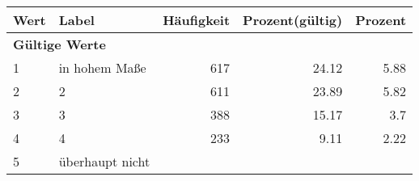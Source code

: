      \begin{longtable}{lXrrr}
     \toprule
     \textbf{Wert} & \textbf{Label} & \textbf{Häufigkeit} & \textbf{Prozent(gültig)} & \textbf{Prozent} \\
     \endhead
     \midrule
     \multicolumn{5}{l}{\textbf{Gültige Werte}}\\

     1 &
     \multicolumn{1}{X}{ in hohem Maße   } &


       \num{617} &
       \num[round-mode=places,round-precision=2]{24.12} &
         \num[round-mode=places,round-precision=2]{5.88} \\

     2 &
     \multicolumn{1}{X}{ 2   } &


       \num{611} &
       \num[round-mode=places,round-precision=2]{23.89} &
         \num[round-mode=places,round-precision=2]{5.82} \\

     3 &
     \multicolumn{1}{X}{ 3   } &


       \num{388} &
       \num[round-mode=places,round-precision=2]{15.17} &
         \num[round-mode=places,round-precision=2]{3.7} \\

     4 &
     \multicolumn{1}{X}{ 4   } &


       \num{233} &
       \num[round-mode=places,round-precision=2]{9.11} &
         \num[round-mode=places,round-precision=2]{2.22} \\

     5 &
     \multicolumn{1}{X}{ überhaupt nicht   } &



\end{longtable}
